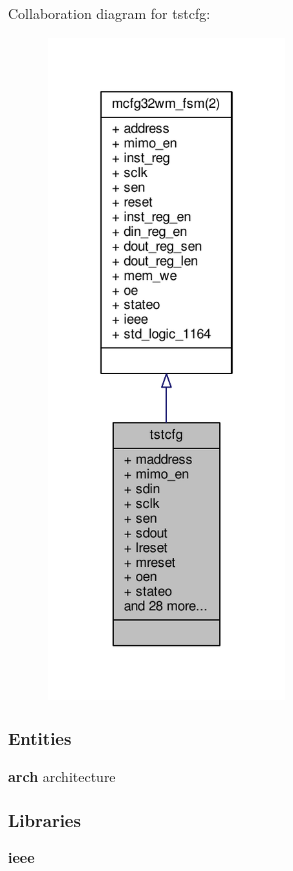 Collaboration diagram for tstcfg\+:\nopagebreak
\begin{figure}[H]
\begin{center}
\leavevmode
\includegraphics[width=178pt]{d6/d37/clasststcfg__coll__graph}
\end{center}
\end{figure}
\subsubsection*{Entities}
\begin{DoxyCompactItemize}
\item 
{\bf arch} architecture
\end{DoxyCompactItemize}
\subsubsection*{Libraries}
 \begin{DoxyCompactItemize}
\item 
{\bf ieee} 
\end{DoxyCompactItemize}
